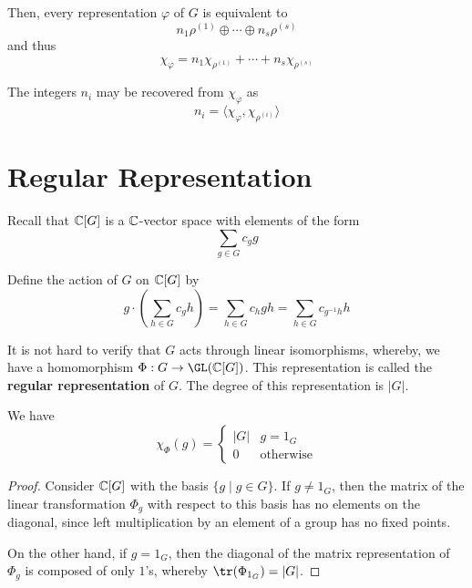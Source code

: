 Then, every representation $\varphi$ of $G$ is equivalent to 
\begin{equation*}
    n_1\rho^{(1)}\oplus\cdots\oplus n_s\rho^{(s)}
\end{equation*}
and thus 
\begin{equation*}
    \chi_\varphi = n_1\chi_{\rho^{(1)}} + \cdots + n_s\chi_{\rho^{(s)}}
\end{equation*}

The integers $n_i$ may be recovered from $\chi_\varphi$ as 
\begin{equation*}
    n_i = \langle\chi_\varphi,\chi_{\rho^{(i)}}\rangle
\end{equation*}

\section{Regular Representation}

Recall that $\mathbb{C}[G]$ is a $\mathbb{C}$-vector space with elements of the form 
\begin{equation*}
    \sum_{g\in G} c_g g
\end{equation*}

Define the action of $G$ on $\mathbb{C}[G]$ by 
\begin{equation*}
    g\cdot\left(\sum_{h\in G} c_g h\right) = \sum_{h\in G}c_h gh = \sum_{h\in G} c_{g^{-1}h}h
\end{equation*}

It is not hard to verify that $G$ acts through linear isomorphisms, whereby, we have a homomorphism $\Phi: G\to\GL(\bbC[G])$. This representation is called the \textbf{regular representation} of $G$. The degree of this representation is $|G|$.

\begin{proposition}
    We have 
    \begin{equation*}
        \chi_\Phi(g) = 
        \begin{cases}
            |G| & g = 1_G\\
            0 & \text{otherwise}
        \end{cases}
    \end{equation*}
\end{proposition}
\begin{proof}
    Consider $\mathbb{C}[G]$ with the basis $\{g\mid g\in G\}$. If $g\ne 1_G$, then the matrix of the linear transformation $\Phi_g$ with respect to this basis has no elements on the diagonal, since left multiplication by an element of a group has no fixed points. 

    On the other hand, if $g = 1_G$, then the diagonal of the matrix representation of $\Phi_g$ is composed of only $1$'s, whereby $\tr(\Phi_{1_G}) = |G|$.
\end{proof}

